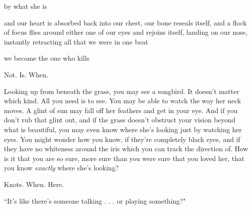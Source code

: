 \documentclass[11pt]{article}
\begin{document}
\begingroup
\begin{center}
by what she is
\rightskip\leftskip
\end{center}
\endgroup

\begingroup
\begin{center}
and our heart is absorbed back into our chest, our bone reseals itself, and a flock of focus flies around either one of our eyes and rejoins itself, landing on our nose, instantly retracting all that we were in one beat
\rightskip\leftskip
\end{center}
\endgroup

\begingroup
\begin{center}
we become the one who kills
\rightskip\leftskip
\end{center}
\endgroup

\vspace*{4\baselineskip}

\begingroup
\begin{center}
Not. Is. When.
\rightskip\leftskip
\end{center}
\endgroup

\vspace*{4\baselineskip}

\begingroup
Looking up from beneath the grass, you may see a songbird. It doesn't matter which kind. All you need is to see. You may be able to watch the way her neck moves. A glint of sun may fall off her feathers and get in your eye. And if you don't rub that glint out, and if the grass doesn't obstruct your vision beyond what is beautiful, you may even know where she's looking just by watching her eyes. You might wonder how you know, if they're completely black eyes, and if they have no whiteness around the iris which you can track the direction of. How is it that you are so sure, more sure than you were sure that you loved her, that you know \textit{exactly} where she's looking?
\endgroup

\vspace*{4\baselineskip}

\begingroup
\begin{center}
Knots. When. Here.
\rightskip\leftskip
\end{center}
\endgroup

\vspace*{4\baselineskip}

\begingroup
\begin{center}
``It's like there's someone talking . . . or playing something?"
\end{center}
\endgroup
\end{document}
